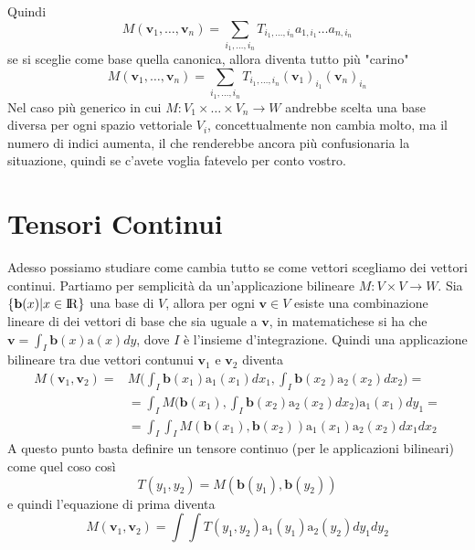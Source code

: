\documentclass[11pt,a4paper]{report}
\newcommand{\vettore}[1]{\mathbf{#1}}
\newcommand{\vettorec}[1]{\textrm{#1}}
\theoremstyle{definition}
\theoremstyle{plain}
\theoremstyle{plain}
\begin{document}
			Quindi
			\begin{equation}
				M(\vettore v_1,\dots,\vettore v_n)=\sum_{i_1,\dots,i_n}T_{i_1,\dots,i_n}a_{1,{i_1}}\dots a_{n,{i_n}}
			\end{equation}
			se si sceglie come base quella canonica, allora diventa tutto più "carino"
			\[
				M(\vettore v_1,\dots,\vettore v_n)=\sum_{i_1,\dots,i_n}T_{i_1,\dots,i_n}
				(\vettore v_1)_{i_1}(\vettore v_n)_{i_n}	
			\]
			Nel caso più generico in cui $M:V_1\times\dots\times V_n\rightarrow W$ andrebbe scelta una base diversa per ogni spazio vettoriale $V_i$, concettualmente non cambia molto, ma il numero di indici aumenta, il che renderebbe ancora più confusionaria la situazione, quindi se c'avete voglia fatevelo per conto vostro.




		\section{Tensori Continui}
			Adesso possiamo studiare come cambia tutto se come vettori scegliamo dei vettori continui.\newline
			Partiamo per semplicità da un'applicazione bilineare $M:V\times V\rightarrow W$.
			Sia $\{\vettore b(x)|x \in \rm I\!R\}$ una base di $V$, allora per ogni $\vettore v\in V$ esiste una combinazione lineare di dei vettori di base che sia uguale a $\vettore v$, in matematichese si ha che $\vettore v=\int_I \vettore b(x)\vettorec a(x)dy$, dove $I$ è l'insieme d'integrazione. Quindi una applicazione bilineare tra due vettori contunui $\vettore v_1$ e $\vettore v_2$ diventa
			\begin{equation}
			\begin{split}
				M(\vettore v_1,\vettore v_2)=& M\bigg(\int_I \vettore b(x_1)\vettorec a_1(x_1)dx_1,\int_I \vettore b(x_2)\vettorec a_2(x_2)dx_2\bigg)=\\
				& =\int_I M\bigg(\vettore b(x_1),\int_I \vettore b(x_2)\vettorec a_2(x_2)dx_2\bigg)\vettorec a_1(x_1)dy_1=\\
				&=\int_I \int_I M(\vettore b(x_1),\vettore b(x_2))\vettorec a_1(x_1)\vettorec a_2(x_2)dx_1dx_2
			\end{split}
			\end{equation}
			A questo punto basta definire un tensore continuo (per le applicazioni bilineari) come quel coso così
			\[
				T(y_1,y_2)=M(\vettore b(y_1),\vettore b(y_2))
			\]
			e quindi l'equazione di prima diventa
			\[
				M(\vettore v_1,\vettore v_2)=\int \int T(y_1,y_2)\vettorec a_1(y_1)\vettorec a_2(y_2)dy_1dy_2
			\]
			\newline
\end{document}
